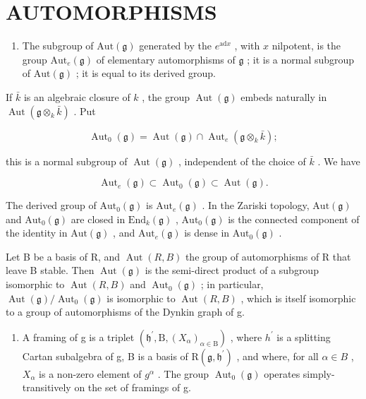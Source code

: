 \section*{AUTOMORPHISMS}

\begin{enumerate}
\def\labelenumi{\arabic{enumi})}
\setcounter{enumi}{15}
\tightlist
\item
  The subgroup of \(\mathrm{Aut}(\mathfrak{g})\) generated by the \(e^{\mathrm{ad}x}\) , with \(x\) nilpotent, is the group \(\mathrm{Aut}_e(\mathfrak{g})\) of elementary automorphisms of \(\mathfrak{g}\) ; it is a normal subgroup of \(\mathrm{Aut}(\mathfrak{g})\) ; it is equal to its derived group.
\end{enumerate}

If \(\bar{k}\) is an algebraic closure of \(k\) , the group \(\operatorname{Aut}(\mathfrak{g})\) embeds naturally in \(\operatorname{Aut}(\mathfrak{g} \otimes_k \bar{k})\) . Put

\[
\operatorname{Aut} _ {0} (\mathfrak {g}) = \operatorname{Aut} (\mathfrak {g}) \cap \operatorname{Aut} _ {e} (\mathfrak {g} \otimes_ {k} \bar {k});
\]

this is a normal subgroup of \(\operatorname{Aut}(\mathfrak{g})\) , independent of the choice of \(\bar{k}\) . We have

\[
\operatorname{Aut} _ {e} (\mathfrak {g}) \subset \operatorname{Aut} _ {0} (\mathfrak {g}) \subset \operatorname{Aut} (\mathfrak {g}).
\]

The derived group of \(\mathrm{Aut}_0(\mathfrak{g})\) is \(\mathrm{Aut}_e(\mathfrak{g})\) . In the Zariski topology, \(\mathrm{Aut}(\mathfrak{g})\) and \(\mathrm{Aut}_0(\mathfrak{g})\) are closed in \(\mathrm{End}_k(\mathfrak{g})\) , \(\mathrm{Aut}_0(\mathfrak{g})\) is the connected component of the identity in \(\mathrm{Aut}(\mathfrak{g})\) , and \(\mathrm{Aut}_e(\mathfrak{g})\) is dense in \(\mathrm{Aut}_0(\mathfrak{g})\) .

Let B be a basis of R, and \(\operatorname{Aut}(R,B)\) the group of automorphisms of R that leave B stable. Then \(\operatorname{Aut}(\mathfrak{g})\) is the semi-direct product of a subgroup isomorphic to \(\operatorname{Aut}(R,B)\) and \(\operatorname{Aut}_{0}(\mathfrak{g})\) ; in particular, \(\operatorname{Aut}(\mathfrak{g})/\operatorname{Aut}_{0}(\mathfrak{g})\) is isomorphic to \(\operatorname{Aut}(R,B)\) , which is itself isomorphic to a group of automorphisms of the Dynkin graph of g.

\begin{enumerate}
\def\labelenumi{\arabic{enumi})}
\setcounter{enumi}{16}
\tightlist
\item
  A framing of g is a triplet \((\mathfrak{h}^{\prime},\mathrm{B},(X_{\alpha})_{\alpha\in\mathrm{B}})\) , where \(h^{\prime}\) is a splitting Cartan subalgebra of g, B is a basis of \(\mathrm{R}(\mathfrak{g},\mathfrak{h}^{\prime})\) , and where, for all \(\alpha\in B\) , \(X_{\alpha}\) is a non-zero element of \(g^{\alpha}\) . The group \(\operatorname{Aut}_{0}(\mathfrak{g})\) operates simply-transitively on the set of framings of g.
\end{enumerate}

